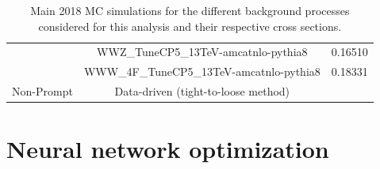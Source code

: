 \documentclass[a4paper, 10pt, openright]{report}
\begin{document}
\begin{appendices}
\begin{table}
\begin{center}
{\begin{tabular}{ c|c|c }
 & WWZ\_TuneCP5\_13TeV-amcatnlo-pythia8 & 0.16510 \\
 & WWW\_4F\_TuneCP5\_13TeV-amcatnlo-pythia8 & 0.18331 \\
 \hline
 Non-Prompt & Data-driven (tight-to-loose method) & \\
 \hline
\end{tabular}
}
\caption{Main 2018 \ac{MC} simulations for the different background processes considered for this analysis and their respective cross sections.}
\label{table:MC2018}
\end{center}
\end{table}

\chapter{Neural network optimization} \label{appendix:Optimization}

\end{appendices}

\listoffigures 

\listoftables

































\end{document}
